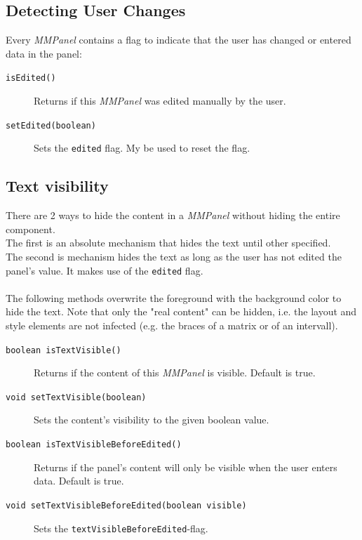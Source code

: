 \documentclass[a4paper,12pt]{book}
\newcommand{\mmp}{\emph{MMPanel }}
\begin{document}
    \subsection{Detecting User Changes}
    Every \mmp contains a flag to indicate that the user has changed or entered data in the panel:
    \begin{description}
      \item[{\tt isEdited()}]
      Returns if this \mmp was edited manually by the user.
      \item[{\tt setEdited(boolean)}] 
      Sets the {\tt edited} flag. My be used to reset the flag.
    \end{description}
    
    \subsection{Text visibility}
    There are 2 ways to hide the content in a \mmp without hiding the entire component.\\
    The first is an absolute mechanism that hides the text until other specified.\\
    The second is mechanism hides the text as long as the user has not edited the panel's value. It makes use of
    the {\tt edited} flag.\\\\
    The following methods overwrite the foreground with the background color to hide the text.
    Note that only the "real content" can be hidden, i.e. the layout and style elements are not infected 
    (e.g. the braces of a matrix or of an intervall).
    \begin{description}
      \item[{\tt boolean isTextVisible()}]
      Returns if the content of this \mmp is visible. Default is true.
      \item[{\tt void setTextVisible(boolean)}] 
      Sets the content's visibility to the given boolean value.\\
      
      \item[{\tt boolean isTextVisibleBeforeEdited()}]
      Returns if the panel's content will only be visible when the user enters data.
      Default is true.
      \item[{\tt void setTextVisibleBeforeEdited(boolean visible)}]
      Sets the {\tt textVisibleBeforeEdited}-flag.
    \end{description}
    
\end{document}
